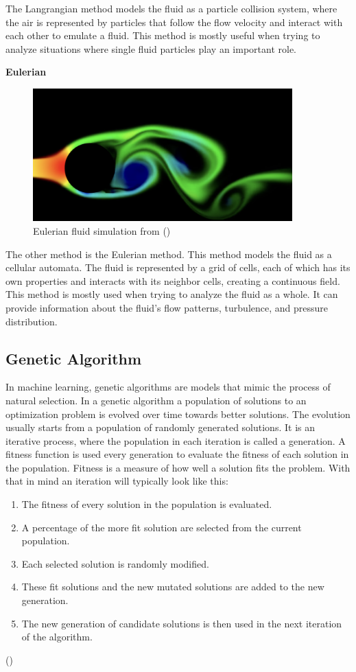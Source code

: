 \documentclass[a4paper,12pt,titlepage]{article}
\begin{document}
The Langrangian method models the fluid as a particle collision system, where the air is represented by
particles that follow the flow velocity and interact with each other to emulate a fluid. 
This method is mostly useful when trying to analyze situations where single fluid particles play an important role.

\pagebreak
\textbf{Eulerian} \\

\begin{figure}[H]
	\centering
	\includegraphics[width=10cm]{resources/eulerian.png}
	\caption{Eulerian fluid simulation from (\cite{tenminute})}
\end{figure}

The other method is the Eulerian method. This method models the fluid as a
cellular automata. The fluid is represented by a grid of cells, each of which
has its own properties and interacts with its neighbor cells, creating a continuous
field. This method is mostly used when trying to analyze the fluid as a whole.
It can provide information about the fluid's flow patterns, turbulence, and pressure distribution. 

\subsection{Genetic Algorithm} \label{genalgsec}
In machine learning, genetic algorithms are models that mimic the process of natural selection.
In a genetic algorithm a population of solutions to an optimization problem is evolved over time towards better solutions.
The evolution usually starts from a population of randomly generated solutions.
It is an iterative process, where the population in each iteration is called a generation.
A fitness function is used every generation to evaluate the fitness of each solution in the population.
Fitness is a measure of how well a solution fits the problem.
With that in mind an iteration will typically look like this:
\begin{enumerate}
	\item{The fitness of every solution in the population is evaluated.}
	\item{A percentage of the more fit solution are selected from the current population.}
	\item{Each selected solution is randomly modified.}
	\item {These fit solutions and the new mutated solutions are added to the new generation.}
	\item{The new generation of candidate solutions is then used in the next iteration of the algorithm.}
\end{enumerate}
(\cite{genalg})
\end{document}
